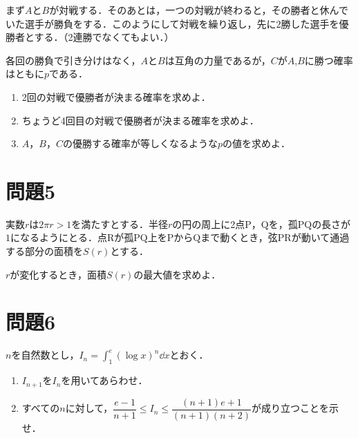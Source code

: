 \documentclass[unicode,12pt, A4j]{ltjsarticle}%
\begin{document}
まず$A$と$B$が対戦する．そのあとは，一つの対戦が終わると，その勝者と休んでいた選手が勝負をする．このようにして対戦を繰り返し，先に$2$勝した選手を優勝者とする．（2連勝でなくてもよい．）

各回の勝負で引き分けはなく，$A$と$B$は互角の力量であるが，$C$が$A$,$B$に勝つ確率はともに$p$である．

\begin{enumerate}
 \item 2回の対戦で優勝者が決まる確率を求めよ．
 \item ちょうど4回目の対戦で優勝者が決まる確率を求めよ．
 \item $A$，$B$，$C$の優勝する確率が等しくなるような$p$の値を求めよ．
\end{enumerate}

\section{問題5}
実数$r$は$2\pi r >1$を満たすとする．半径$r$の円の周上に2点$\mathrm{P}$，$\mathrm{Q}$を，孤$\mathrm{PQ}$の長さが$1$になるようにとる．点$\mathrm{R}$が孤$\mathrm{PQ}$上を$\mathrm{P}$から$\mathrm{Q}$まで動くとき，弦$\mathrm{PR}$が動いて通過する部分の面積を$S(r)$とする．

$r$が変化するとき，面積$S(r)$の最大値を求めよ．

\section{問題6}
$n$を自然数とし，${\displaystyle I_n=\int_{1}^{e}\left(\log x\right)^n \dd x}$とおく．
\begin{enumerate}
 \item $I_{n+1}$を$I_n$を用いてあらわせ．
 \item すべての$n$に対して，$\dfrac{e-1}{n+1}\le I_n \le \dfrac{(n+1)e+1}{(n+1)(n+2)}$が成り立つことを示せ．
\end{enumerate}
\end{document}
